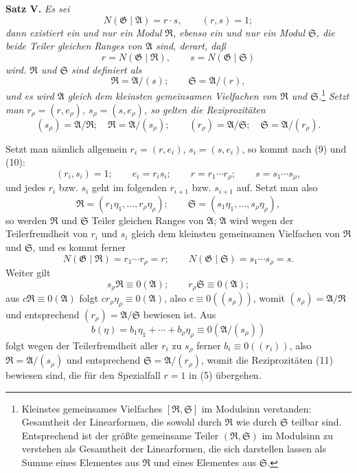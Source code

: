 \documentclass[11pt]{article}
\newcommand{\Amod}{\mathfrak A}
\newcommand{\Gmod}{\mathfrak G}
\newcommand{\Rmod}{\mathfrak R}
\newcommand{\Smod}{\mathfrak S}
\newcommand{\zero}[1]{\equiv 0(#1)}
\newcommand{\Norm}{N}
\begin{document}
\medskip
\noindent\textbf{Satz V.} \emph{Es sei}
\begin{equation}
 \Norm(\Gmod\mid\Amod)=r\cdot s,\qquad (r,s)=1;
\tag{10}
\end{equation}
\emph{dann existiert ein und nur ein Modul $\Rmod$, ebenso ein und nur ein Modul $\Smod$, die beide Teiler gleichen Ranges von $\Amod$ sind, derart, daß}
\[
 r=\Norm(\Gmod\mid\Rmod),\qquad s=\Norm(\Gmod\mid\Smod)
\]
\emph{wird. $\Rmod$ und $\Smod$ sind definiert als}
\[
 \Rmod=\Amod/(s);\qquad \Smod=\Amod/(r),
\]
\emph{und es wird $\Amod$ gleich dem kleinsten gemeinsamen Vielfachen von $\Rmod$ und $\Smod$.}\footnote{Kleinstes gemeinsames Vielfaches $[\Rmod,\Smod]$ im Modulsinn verstanden: Gesamtheit der Linearformen, die sowohl durch $\Rmod$ wie durch $\Smod$ teilbar sind. Entsprechend ist der größte gemeinsame Teiler $(\Rmod,\Smod)$ im Modulsinn zu verstehen als Gesamtheit der Linearformen, die sich darstellen lassen als Summe eines Elementes aus $\Rmod$ und eines Elementes aus $\Smod$.}
\emph{Setzt man $r_\rho=(r,e_\rho)$, $s_\rho=(s,e_\rho)$, so gelten die Reziprozitäten}
\begin{equation}
 (s_\rho)=\Amod/\Rmod;\quad \Rmod=\Amod/(s_\rho);
 \qquad
 (r_\rho)=\Amod/\Smod;\quad \Smod=\Amod/(r_\rho).
\tag{11}
\end{equation}

Setzt man nämlich allgemein $r_i=(r,e_i)$, $s_i=(s,e_i)$, so kommt nach (9) und (10):
\[
 (r_i,s_i)=1;\qquad e_i=r_is_i;\qquad r=r_1\cdots r_\rho;\qquad s=s_1\cdots s_\rho,
\]
und jedes $r_i$ bzw. $s_i$ geht im folgenden $r_{i+1}$ bzw. $s_{i+1}$ auf. Setzt man also
\[
 \Rmod=(r_1\eta_1,\ldots,r_\rho\eta_\rho);\qquad
 \Smod=(s_1\eta_1,\ldots,s_\rho\eta_\rho),
\]
so werden $\Rmod$ und $\Smod$ Teiler gleichen Ranges von $\Amod$; $\Amod$ wird wegen der Teilerfremdheit von $r_i$ und $s_i$ gleich dem kleinsten gemeinsamen Vielfachen von $\Rmod$ und $\Smod$, und es kommt ferner
\[
 \Norm(\Gmod\mid\Rmod)=r_1\cdots r_\rho=r;\qquad
 \Norm(\Gmod\mid\Smod)=s_1\cdots s_\rho=s.
\]
Weiter gilt
\[
 s_\rho\Rmod\zero{\Amod};\qquad r_\rho\Smod\zero{\Amod};
\]
aus $c\Rmod\zero{\Amod}$ folgt $cr_\rho\eta_\rho\zero{\Amod}$, also $c\zero{(s_\rho)}$, womit $(s_\rho)=\Amod/\Rmod$ und entsprechend $(r_\rho)=\Amod/\Smod$ bewiesen ist. Aus
\[
 b(\eta)=b_1\eta_1+\cdots+b_\rho\eta_\rho\zero{\Amod/(s_\rho)}
\]
folgt wegen der Teilerfremdheit aller $r_i$ zu $s_\rho$ ferner $b_i\zero{(r_i)}$, also $\Rmod=\Amod/(s_\rho)$ und entsprechend $\Smod=\Amod/(r_\rho)$, womit die Reziprozitäten (11) bewiesen sind, die für den Spezialfall $r=1$ in (5) übergehen.
\end{document}
